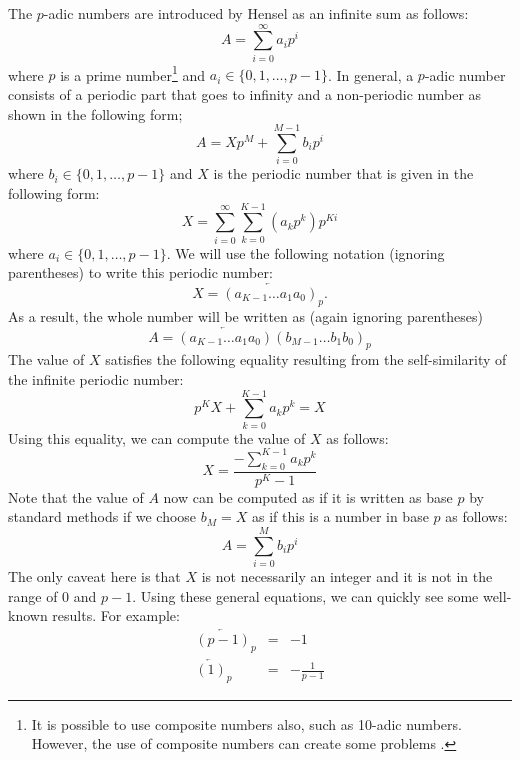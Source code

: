 \documentclass[times,twocolumn,final]{elsarticle}
\begin{document}
The $p$-adic numbers are introduced by Hensel \cite{hensel1897neue} as an infinite sum as follows: 
\begin{equation}
A = \sum_{i=0}^{\infty} a_i p^i
\end{equation} 
where $p$ is a prime number\footnote{It is possible to use composite numbers also, such as 10-adic numbers. However, the use of composite numbers can create some problems \cite{tanton2019serious}.} and $a_i \in \{0,1,\ldots,p-1\}$. In general, a $p$-adic number consists of a periodic part that goes to infinity and a non-periodic number as shown in the following form; 
\begin{equation}
A = X p^M +  \sum_{i=0}^{M-1} b_i p^i
\end{equation} 
where $b_i \in \{0,1,\ldots,p-1\}$ and $X$ is the periodic number that is given in the following form: 
\begin{equation}
X = \sum_{i=0}^{\infty} \sum_{k=0}^{K-1} (a_k p^k) p^{Ki}
\end{equation} 
where $a_i \in \{0,1,\ldots,p-1\}$.
We will use the following notation (ignoring parentheses) to write this periodic number:
$$X = \overleftarrow{(a_{K-1}\ldots a_1a_0)}_p.$$
As a result, the whole number will be written as (again ignoring parentheses) $$ A = \overleftarrow{(a_{K-1}\ldots a_1a_0)} (b_ {M-1}\ldots b_1b_0)_p $$
The value of $X$ satisfies the following equality resulting from the self-similarity of the infinite periodic number: 
\begin{equation}
p^K X +  \sum_{k=0}^{K-1} a_k p^k = X
\end{equation}
Using this equality, we can compute the value of $X$ as follows: 
\begin{equation}
X = \frac{-\displaystyle \sum_{k=0}^{K-1} a_k p^k}{p^K-1} 
\end{equation}
Note that the value of $A$ now can be computed as if it is written as base $p$ by standard methods if we choose $b_M = X$ as if this is a number in base $p$ as follows: 
\begin{equation}
A = \sum_{i=0}^{M} b_i p^i
\end{equation}
The only caveat here is that $X$ is not necessarily an integer and it is not in the range of $0$ and $p-1$. Using these general equations, we can quickly see some well-known results. For example: 
\begin{eqnarray}
\overleftarrow{(p-1)}_p &=& -1 \nonumber\\
\overleftarrow{(1)}_p &=& -\frac{1}{p-1}
\nonumber
\end{eqnarray}
\end{document}
